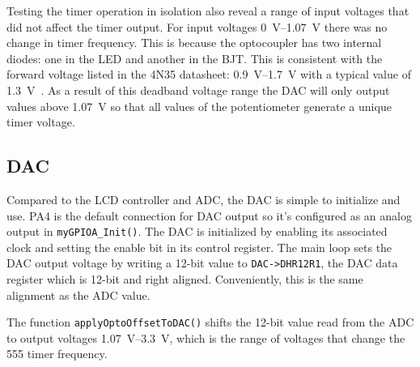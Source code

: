 Testing the timer operation in isolation also reveal a range of input voltages that did not affect the timer output.
For input voltages \SIrange{0}{1.07}{\volt} there was no change in timer frequency.
This is because the optocoupler has two internal diodes: one in the LED and another in the BJT.
This is consistent with the forward voltage listed in the 4N35 datasheet: \SIrange{0.9}{1.7}{\volt} with a typical value of \SI{1.3}{\volt}~\cite{V:4N35}.
As a result of this deadband voltage range the DAC will only output values above \SI{1.07}{\volt} so that all values of the potentiometer generate a unique timer voltage.

\subsection{DAC}\label{sec:dac}
Compared to the LCD controller and ADC, the DAC is simple to initialize and use.
PA4 is the default connection for DAC output so it's configured as an analog output in \texttt{myGPIOA\_Init()}.
The DAC is initialized by enabling its associated clock and setting the enable bit in its control register.
The main loop sets the DAC output voltage by writing a 12-bit value to \texttt{DAC->DHR12R1}, the DAC data register which is 12-bit and right aligned.
Conveniently, this is the same alignment as the ADC value.

The function \texttt{applyOptoOffsetToDAC()} shifts the 12-bit value read from the ADC to output voltages \SIrange{1.07}{3.3}{\volt}, which is the range of voltages that change the 555 timer frequency.

